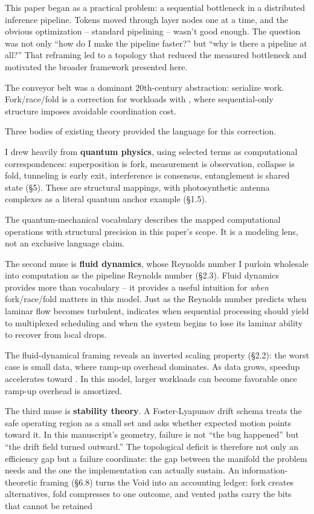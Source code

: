 \documentclass[
]{article}
\begin{document}
This paper began as a practical problem: a sequential bottleneck in a
distributed inference pipeline. Tokens moved through layer nodes one at
a time, and the obvious optimization -- standard pipelining -- wasn't
good enough. The question was not only ``how do I make the pipeline
faster?'' but ``why is there a pipeline at all?'' That reframing led to
a topology that reduced the measured bottleneck and motivated the
broader framework presented here.

The conveyor belt was a dominant 20th-century abstraction: serialize
work. Fork/race/fold is a correction for workloads with , where
sequential-only structure imposes avoidable coordination cost.

Three bodies of existing theory provided the language for this
correction.

I drew heavily from \textbf{quantum physics}, using selected terms as
computational correspondences: superposition is fork, measurement is
observation, collapse is fold, tunneling is early exit, interference is
consensus, entanglement is shared state (§5). These are structural
mappings, with photosynthetic antenna complexes as a literal quantum
anchor example (§1.5).

The quantum-mechanical vocabulary describes the mapped computational
operations with structural precision in this paper's scope. It is a
modeling lens, not an exclusive language claim.

The second muse is \textbf{fluid dynamics}, whose Reynolds number I
purloin wholesale into computation as the pipeline Reynolds number
(§2.3). Fluid dynamics provides more than vocabulary -- it provides a
useful intuition for \emph{when} fork/race/fold matters in this model.
Just as the Reynolds number predicts when laminar flow becomes
turbulent, indicates when sequential processing should yield to
multiplexed scheduling and when the system begins to lose its laminar
ability to recover from local drops.

The fluid-dynamical framing reveals an inverted scaling property (§2.2):
the worst case is small data, where ramp-up overhead dominates. As data
grows, speedup accelerates toward . In this model, larger workloads can
become favorable once ramp-up overhead is amortized.

The third muse is \textbf{stability theory}. A Foster-Lyapunov drift
schema treats the safe operating region as a small set and asks whether
expected motion points toward it. In this manuscript's geometry, failure
is not ``the bug happened'' but ``the drift field turned outward.'' The
topological deficit is therefore not only an efficiency gap but a
failure coordinate: the gap between the manifold the problem needs and
the one the implementation can actually sustain. An
information-theoretic framing (§6.8) turns the Void into an accounting
ledger: fork creates alternatives, fold compresses to one outcome, and
vented paths carry the bits that cannot be retained
\end{document}
